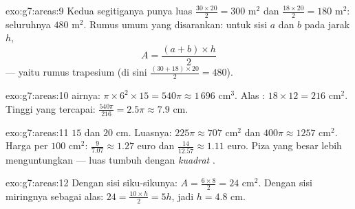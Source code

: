 \begin{solution}{exo:g7:areas:9}
Kedua segitiganya punya luas $\frac{30 \times 20}{2} = 300$ m$^2$
dan $\frac{18 \times 20}{2} = 180$ m$^2$: seluruhnya $480$ m$^2$.
Rumus umum yang disarankan: untuk sisi  $a$ dan $b$ pada jarak $h$,
\[
A = \frac{(a + b) \times h}{2}
\]
--- yaitu rumus trapesium (di sini $\frac{(30+18)\times 20}{2} = 480$).
\end{solution}

\begin{solution}{exo:g7:areas:10}
 airnya: $\pi \times 6^2 \times 15 = 540\pi \approx 1\,696$
cm$^3$. Alas : $18 \times 12 = 216$ cm$^2$. Tinggi yang
tercapai: $\frac{540\pi}{216} = 2.5\pi \approx 7.9$ cm.
\end{solution}

\begin{solution}{exo:g7:areas:11}
 $15$ dan $20$ cm. Luasnya: $225\pi \approx 707$ cm$^2$
dan $400\pi \approx 1257$ cm$^2$. Harga per $100$ cm$^2$:
$\frac{9}{7.07} \approx 1.27$ euro dan
$\frac{14}{12.57} \approx 1.11$ euro. Piza yang besar lebih
menguntungkan --- luas tumbuh dengan \emph{kuadrat} .
\end{solution}

\begin{solution}{exo:g7:areas:12}
Dengan sisi siku-sikunya: $A = \frac{6 \times 8}{2} = 24$ cm$^2$.
Dengan sisi miringnya sebagai alas: $24 = \frac{10 \times h}{2} = 5h$,
jadi $h = 4.8$ cm.
\end{solution}

